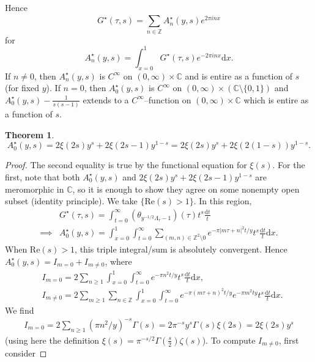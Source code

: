 \documentclass{article}
\theoremstyle{definition}
\newtheorem{theorem}{Theorem}[section]
\begin{document}
Hence \[
G^{\star}(\tau,s) = \sum_{n \in \mathbb{Z}}^{} A_n^{\star}(y,s)e^{2\pi i n x}
\]
for $$A_n^{\star}(y,s) = \int_{x=0}^{1} G^{\star}(\tau,s)e^{-2\pi i n x}\mathrm{d}x.$$
If $n\neq 0$, then $A_n^{\star}(y,s)$ is $C^{\infty}$ on $(0,\infty) \times \mathbb{C}$ and is entire as a function of $s$ (for fixed $y$). If $n=0$, then $A_0^{\star}(y,s)$ is $C^{\infty}$ on $(0,\infty) \times (\mathbb{C} \setminus  \{0,1\})$ and $A_0^{\star}(y,s) - \frac{1}{s(s-1)}$ extends to a $C^{\infty}$--function on $(0,\infty) \times \mathbb{C}$ which is entire as a function of $s$.
\begin{theorem}
    \[
    A_0^{\star}(y,s) = 2 \xi(2s)y^s + 2\xi(2s-1)y^{1-s} = 2\xi(2s)y^s +2\xi(2(1-s))y^{1-s}.
    \]
\end{theorem}
\begin{proof}
    The second equality is true by the functional equation for $\xi(s)$. For the first, note that both $A_0^{\star}(y,s)$ and $2\xi(2s)y^s + 2\xi(2s-1)y^{1-s}$ are meromorphic in $\mathbb{C}$, so it is enough to show they agree on some nonempty open subset (identity principle). We take $\{\text{Re}(s)>1\}$. In this region, 
    \begin{align*}
        &G^{\star}(\tau,s) = \int_{t=0}^{\infty} \left(\theta_{y^{-1/2}\Lambda_\tau-1}\right)(\tau)t^s \frac{\mathrm{d}t}{t} \\
        \implies & A_0^{\star}(y,s) = \int_{x=0}^{1} \int_{t=0}^{\infty} \sum_{(m,n)\in\mathbb{Z}^2\setminus 0}^{} e^{-\pi |m \tau + n|^2 t/y}t^s \frac{\mathrm{d}t}{t}\mathrm{d}x.
    \end{align*}
    When $\text{Re}(s)>1$, this triple integral/sum is absolutely convergent. Hence $A_0^{\star}(y,s) = I_{m=0} + I_{m \neq 0}$, where 
    \begin{align*}
        &I_{m=0} = 2 \sum_{n\ge 1}^{} \int_{x=0}^{1} \int_{t=0}^{\infty} e^{-\pi n^2 t/y}t^s\frac{\mathrm{d}t}{t}\mathrm{d}x, \\
        &I_{m\neq 0} = 2 \sum_{m\ge 1}^{} \sum_{n \in \mathbb{Z}}^{} \int_{x=0}^{1} \int_{t=0}^{\infty} e^{-\pi (m \tau + n)^2 t /y } e^{-\pi m^2 t y}t^s\frac{\mathrm{d}t}{t}\mathrm{d}x.
    \end{align*} 
    We find 
    \begin{align*}
        I_{m=0} = 2 \sum_{n\ge 1}^{} (\pi n^2/y)^{-s}\Gamma(s) = 2 \pi^{-s}y^s \Gamma(s)\xi(2s) = 2\xi(2s)y^s
    \end{align*}
    (using here the definition $\xi(s) = \pi^{-s/2}\Gamma \left(\frac{s}{2}\right)\zeta(s)$). To compute $I_{m\neq 0}$, first consider 

\end{proof}
\end{document}
